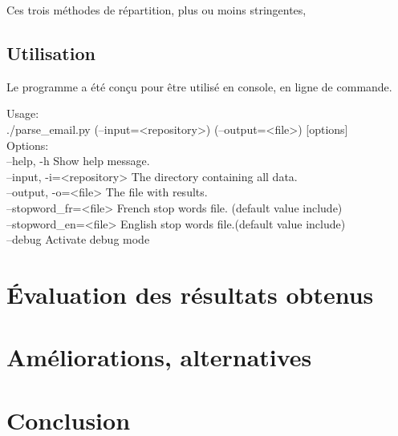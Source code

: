 \documentclass[11pt,a4paper]{article}
\begin{document}
Ces trois méthodes de répartition, plus ou moins stringentes, 

\subsection*{Utilisation}
Le programme a été conçu pour être utilisé en console, en ligne de commande.

Usage:\\
    ./parse\_email.py (--input=<repository>) (--output=<file>) [options]\\

Options:\\
    --help, -h                  Show help message.\\
    --input, -i=<repository>    The directory containing all data.\\
    --output, -o=<file>         The file with results.\\
    --stopword\_fr=<file>       French stop words file. (default value include)\\
    --stopword\_en=<file>       English stop words file.(default value include)\\
    --debug                     Activate debug mode\\


\section*{Évaluation des résultats obtenus}

\section*{Améliorations, alternatives}

\section*{Conclusion}
\end{document}
